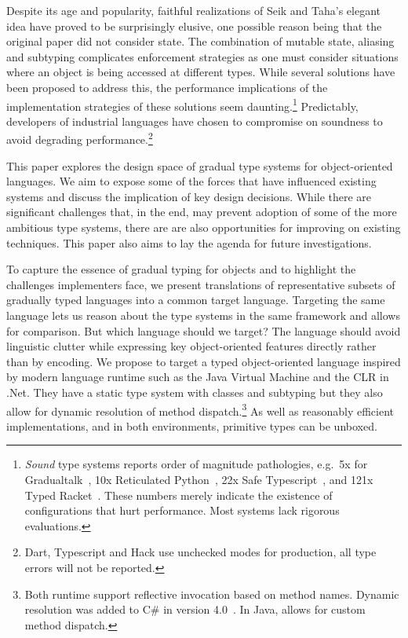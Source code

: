 \documentclass[a4paper,USenglish]{tex/lipics-v2016}
\begin{document}
Despite its age and popularity, faithful realizations of Seik and Taha's
elegant idea have proved to be surprisingly elusive, one possible reason
being that the original paper did not consider state. The combination of
mutable state, aliasing and subtyping complicates enforcement strategies as
one must consider situations where an object is being accessed at different
types. While several solutions have been proposed to address this, the
performance implications of the implementation strategies of these solutions
seem daunting.\footnote{\emph{Sound} type systems reports order of magnitude
  pathologies, e.g.~5x for Gradualtalk~\cite{allende13}, 10x Reticulated
  Python~\cite{siek14}, 22x Safe Typescript~\cite{safe-typescript}, and 121x
  Typed Racket~\cite{popl16}. These numbers merely indicate the existence of
  configurations that hurt performance.  Most systems lack rigorous
  evaluations. } Predictably, developers of industrial languages have chosen
to compromise on soundness to avoid degrading performance.\footnote{Dart,
  Typescript and Hack use unchecked modes for production, all type errors
  will not be reported.}

This paper explores the design space of gradual type systems for object-oriented
languages. We aim to expose some of the forces that have influenced existing
systems and discuss the implication of key design decisions. While there are
significant challenges that, in the end, may prevent adoption of some of the
more ambitious type systems, there are are also opportunities for improving on
existing techniques.  This paper also aims to lay the agenda for future
investigations.

To capture the essence of gradual typing for objects and to highlight the
challenges implementers face, we present translations of representative subsets
of gradually typed languages into a common target language. Targeting the same
language lets us reason about the type systems in the same framework and allows
for comparison. But which language should we target? The language should avoid
linguistic clutter while expressing key object-oriented features directly rather
than by encoding. We propose to target a typed object-oriented language
inspired by modern language runtime such as the Java Virtual Machine and the
CLR in .Net. They have a static type system with classes and subtyping but they
also allow for dynamic resolution of method dispatch.\footnote{Both runtime
support reflective invocation based on method names. Dynamic resolution was
added to C\# in version 4.0~\cite{BAT14}. In Java,  allows for
custom method dispatch.} As well as reasonably efficient implementations, and in
both environments, primitive types can be unboxed.
\end{document}
